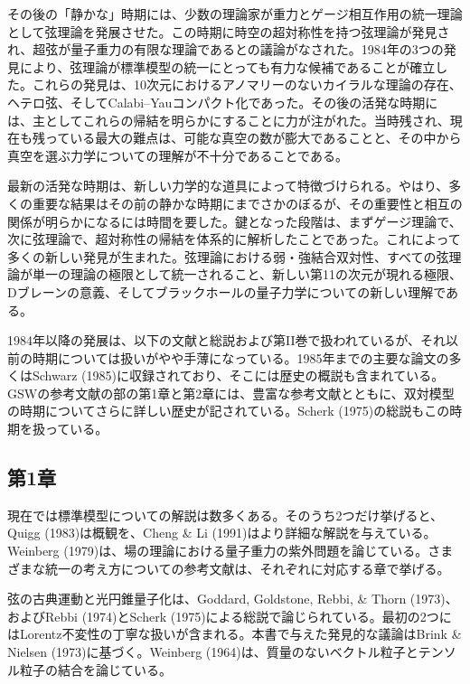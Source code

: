 その後の「静かな」時期には、少数の理論家が重力とゲージ相互作用の統一理論として弦理論を発展させた。この時期に時空の超対称性を持つ弦理論が発見され、超弦が量子重力の有限な理論であるとの議論がなされた。1984年の3つの発見により、弦理論が標準模型の統一にとっても有力な候補であることが確立した。これらの発見は、10次元におけるアノマリーのないカイラルな理論の存在、ヘテロ弦、そしてCalabi--Yauコンパクト化であった。その後の活発な時期には、主としてこれらの帰結を明らかにすることに力が注がれた。当時残され、現在も残っている最大の難点は、可能な真空の数が膨大であることと、その中から真空を選ぶ力学についての理解が不十分であることである。

最新の活発な時期は、新しい力学的な道具によって特徴づけられる。やはり、多くの重要な結果はその前の静かな時期にまでさかのぼるが、その重要性と相互の関係が明らかになるには時間を要した。鍵となった段階は、まずゲージ理論で、次に弦理論で、超対称性の帰結を体系的に解析したことであった。これによって多くの新しい発見が生まれた。弦理論における弱・強結合双対性、すべての弦理論が単一の理論の極限として統一されること、新しい第11の次元が現れる極限、Dブレーンの意義、そしてブラックホールの量子力学についての新しい理解である。

1984年以降の発展は、以下の文献と総説および第II巻で扱われているが、それ以前の時期については扱いがやや手薄になっている。1985年までの主要な論文の多くはSchwarz (1985)に収録されており、そこには歴史の概説も含まれている。GSWの参考文献の部の第1章と第2章には、豊富な参考文献とともに、双対模型の時期についてさらに詳しい歴史が記されている。Scherk (1975)の総説もこの時期を扱っている。

\subsection*{第1章}
現在では標準模型についての解説は数多くある。そのうち2つだけ挙げると、Quigg (1983)は概観を、Cheng \& Li (1991)はより詳細な解説を与えている。Weinberg (1979)は、場の理論における量子重力の紫外問題を論じている。さまざまな統一の考え方についての参考文献は、それぞれに対応する章で挙げる。

弦の古典運動と光円錐量子化は、Goddard, Goldstone, Rebbi, \& Thorn (1973)、およびRebbi (1974)とScherk (1975)による総説で論じられている。最初の2つにはLorentz不変性の丁寧な扱いが含まれる。本書で与えた発見的な議論はBrink \& Nielsen (1973)に基づく。Weinberg (1964)は、質量のないベクトル粒子とテンソル粒子の結合を論じている。

